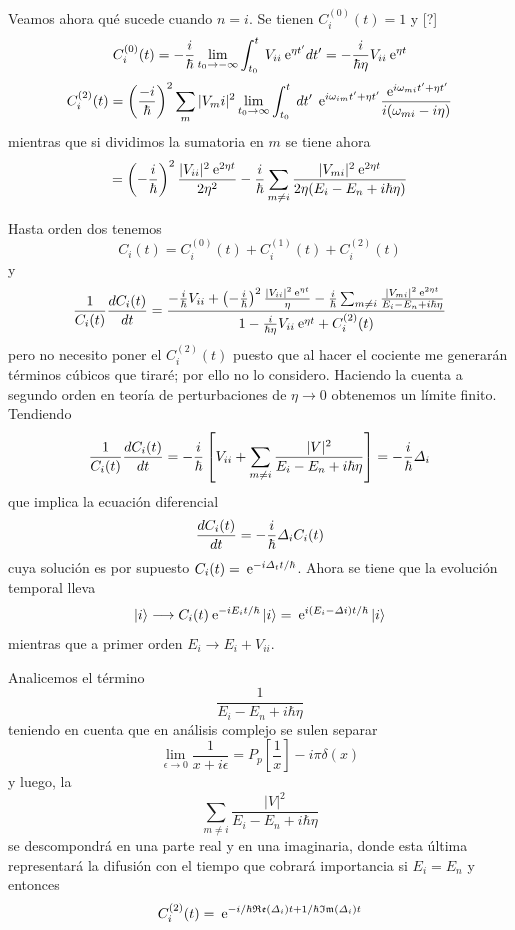 \documentclass[10pt,oneside]{CBFT_book}
\begin{document}
Veamos ahora qué sucede cuando $n=i$. Se tienen $C_i^{(0)}(t) = 1$ y [?]
\[
	C_i^{(0)}(t) = - \frac{i}{\hbar} \lim_{t_0 \to -\infty}
	\int_{t_0}^t \: V_{ii} \:\mathrm{e}^{\eta t '} dt' = -\frac{ i }{\hbar \eta } V_{ii}\:\mathrm{e}^{\eta t}
\]
\[
	C_i^{(2)}(t) = \left( \frac{ -i }{ \hbar } \right)^2 \sum_m |V_mi|^2 \lim_{t_0\to\infty}
	\int_{t_0}^t \: dt' \: \:\mathrm{e}^{i \omega_{im} t' + \eta t' }
	\frac{\:\mathrm{e}^{i \omega_{mi} t' + \eta t' }}{ i ( \omega_{mi} - i \eta ) }
\]
mientras que si dividimos la sumatoria en $m$ se tiene ahora
\[
	= \left( -\frac{i}{\hbar} \right)^2 \frac{|V_{ii}|^2 \:\mathrm{e}^{2\eta t}}{2\eta^2}
	- \frac{i}{\hbar} \sum_{m\neq i} \frac{|V_{mi}|^2 \:\mathrm{e}^{2 \eta t}}{ 2 \eta ( E_i - E_n + i \hbar \eta ) }
\]

Hasta orden dos tenemos
\[
	C_i(t) = C_i^{(0)}(t) + C_i^{(1)}(t) + C_i^{(2)}(t)
\]
y
\[
	\frac{1}{C_i(t)} \frac{d^{\hspace{-0.05em}} {C_i(t)}}{d {t}^{\hspace{-0.05em}}} = 
	\frac{ 
	-\frac{i}{\hbar} V_{ii} 
	+ \left( -\frac{i}{\hbar} \right)^2 \frac{|V_{ii}|^2 \:\mathrm{e}^{\eta t}}{\eta}
	- \frac{i}{\hbar} \sum_{m\neq i} \frac{|V_{mi}|^2 \:\mathrm{e}^{2 \eta t}}{E_i - E_n + i \hbar \eta }
	}
	{
	1 - \frac{i}{\hbar \eta} V_{ii} \:\mathrm{e}^{\eta t} + C_i^{(2)}(t)
	}
\]
pero no necesito poner el $C_i^{(2)}(t)$ puesto que al hacer el cociente me generarán términos
cúbicos que tiraré; por ello no lo considero.
Haciendo la cuenta a segundo orden en teoría de perturbaciones de $\eta \to 0$ obtenemos un
límite finito. Tendiendo
\[
	\frac{1}{C_i(t)} \frac{d^{\hspace{-0.05em}} {C_i(t)}}{d {t}^{\hspace{-0.05em}}} = -\frac{i}{\hbar}
	\left[ 
	V_{ii} + \sum_{m\neq i} \frac{|V|^2}{E_i - E_n + i \hbar \eta }
	\right] = -\frac{i}{\hbar} \Delta_i
\]
que implica la ecuación diferencial 
\[
	\frac{d^{\hspace{-0.05em}} {C_i(t)}}{d {t}^{\hspace{-0.05em}}} = - \frac{i}{\hbar} \Delta_i C_i(t)
\]
cuya solución es por supuesto $ C_i(t) = \:\mathrm{e}^{- i \Delta_t t / \hbar } $.
Ahora se tiene que la evolución temporal lleva 
\[
	\Ket{i} \longrightarrow C_i(t) \:\mathrm{e}^{-i E_i t /\hbar} \ket{i} = 
	\:\mathrm{e}^{i (E_i -\Delta i) t / \hbar } \Ket{i}
\]
mientras que a primer orden $ E_i \to E_i + V_{ii}$.

Analicemos el término
\[
	\frac{1}{E_i - E_n + i \hbar \eta}
\]
teniendo en cuenta que en análisis complejo se sulen separar 
\[
	\lim_{\epsilon \to 0 } \frac{1}{x + i  \epsilon} = P_p\left[ \frac{1}{x}\right] - i \pi \delta(x)
\]
y luego, la
\[
	\sum_{m\neq i} \frac{|V|^2}{E_i - E_n + i \hbar \eta }
\]
se descompondrá en una parte real y en una imaginaria, donde esta última representará la difusión con
el tiempo que cobrará importancia si $ E_i = E_n $ y entonces
\[
	C_i^{(2)}(t) = \:\mathrm{e}^{- i/\hbar \mathfrak{Re}(\Delta_i) t  + 1/\hbar \mathfrak{Im}(\Delta_i) t}
\]
\end{document}
